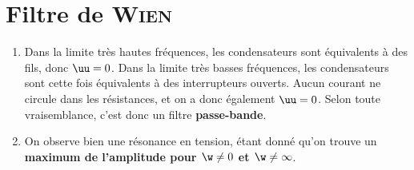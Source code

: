 \documentclass[a4paper, 12pt, final, garamond]{book}
\begin{document}
\section{Filtre de \textsc{Wien}}
\begin{enumerate}
    \item Dans la limite très hautes fréquences, les condensateurs sont
        équivalents à des fils, donc $\uu = 0$. Dans la limite très basses
        fréquences, les condensateurs sont cette fois équivalents à des
        interrupteurs ouverts. Aucun courant ne circule dans les résistances, et
        on a donc également $\uu = 0$. Selon toute vraisemblance, c'est donc
        un filtre \textbf{passe-bande}.
    \item On observe bien une résonance en tension, étant donné qu'on trouve un
        \textbf{maximum de l'amplitude pour $\w \neq 0$ et $\w \neq \infty$}.


\end{enumerate}
\end{document}
